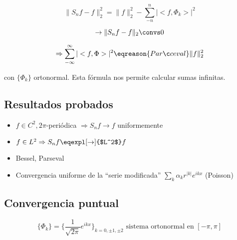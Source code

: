 		\begin{corol}

		\[ \| S_n f - f \|_2^2 = \|f\|_2^2 - \sum_{-n}^{n} |<f, \Phi_k>|^2\]

		\[\rightarrow \|S_n f - f \|_2 \convs 0 \]

		\[\Rightarrow  \sum_{-\infty}^{\infty} | <f, \Phi>|^2 \eqreason{Parçeval} \|f\|_2^2 \]

		con $\{\Phi_k\}$ ortonormal. Esta fórmula nos permite calcular sumas infinitas.

		\end{corol}


	\subsection{Resultados probados}


		\begin{itemize}

			\item $f \in C^2, 2\pi$-periódica $\Rightarrow S_n f \rightarrow f$ uniformemente

			\item $f\in L^2 \Rightarrow S_n f \eqexpl[\rightarrow]{$L^2$} f$

			\item Bessel, Parseval

			\item Convergencia uniforme de la ``serie modificada'' $\sum\limits_k \alpha_k r^{|k|} e^{ikx}$ (Poisson)

		\end{itemize}


	\subsection{Convergencia puntual}

	\begin{theorem}

		\[ \{\Phi_k\} = \{\frac{1}{\sqrt{2\pi}} e^{ikx}\}_{k=0, ±1,±2}  \text{ sistema ortonormal en } [-\pi,\pi]\]



	\end{theorem}

